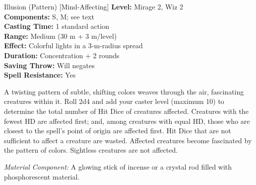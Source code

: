 {Illusion (Pattern) [Mind-Affecting]}
{
	\textbf{Level:}
	Mirage 2, Wiz 2\\
	\textbf{Components:}
	S, M; see text\\
	\textbf{Casting Time:}
	1 standard action\\
	\textbf{Range:}
	Medium (30 m + 3 m/level)\\
	\textbf{Effect:}
	Colorful lights in a 3-m-radius spread\\
	\textbf{Duration:}
	Concentration + 2 rounds\\
	\textbf{Saving Throw:}
	Will negates\\
	\textbf{Spell Resistance:}
	Yes\\
}
{
	A twisting pattern of subtle, shifting colors weaves through the air, fascinating creatures within it. Roll 2d4 and add your caster level (maximum 10) to determine the total number of Hit Dice of creatures affected. Creatures with the fewest HD are affected first; and, among creatures with equal HD, those who are closest to the spell's point of origin are affected first. Hit Dice that are not sufficient to affect a creature are wasted. Affected creatures become fascinated by the pattern of colors. Sightless creatures are not affected.

	\textit{Material Component:}
	A glowing stick of incense or a crystal rod filled with phosphorescent material.

}
